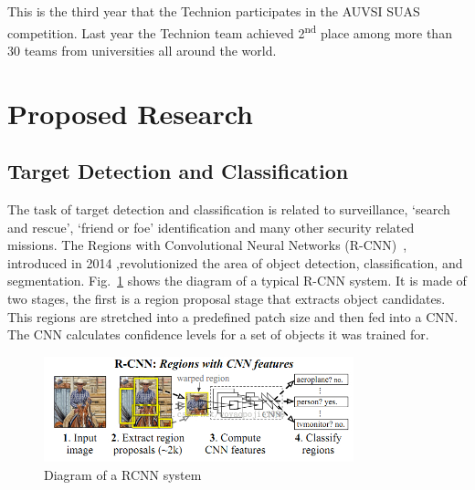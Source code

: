 \documentclass[a4paper]{article} %
\begin{document}
This is the third year that the Technion participates in the AUVSI SUAS
competition. Last year the Technion team achieved 2\textsuperscript{nd} place
among more than 30 teams from universities all around the world.

\section{Proposed Research}

\subsection{Target Detection and Classification}
\label{sec:target_detect_and_class}

The task of target detection and classification is related to surveillance,
`search and rescue', `friend or foe' identification and many other security
related missions. The Regions with Convolutional Neural Networks
(R-CNN)~\cite{Girshick2014}, introduced in 2014 ,revolutionized the area of
object detection, classification, and segmentation. Fig.~\ref{fig:RCNN} shows the
diagram of a typical R-CNN system. It is made of two stages, the first is a
region proposal stage that extracts object candidates. This regions are
stretched into a predefined patch size and then fed into a CNN. The CNN
calculates confidence levels for a set of objects it was trained for.
\begin{figure}[h]
	\centering
	\includegraphics[width=0.8\textwidth]{RCNN}
	\caption{Diagram of a RCNN system}
	\label{fig:RCNN}
\end{figure}
\end{document}
